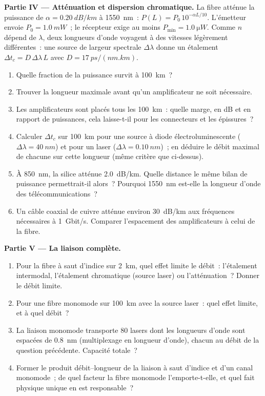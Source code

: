 \begin{problem}
\medskip
\noindent\textbf{Partie IV --- Atténuation et dispersion chromatique.}
La fibre atténue la puissance de $\alpha = \qty{0.20}{dB/km}$ à
\qty{1550}{nm}~: $P(L) = P_0\,10^{-\alpha L/10}$. L'émetteur envoie
$P_0 = \qty{1.0}{mW}$~; le récepteur exige au moins
$P_{\min} = \qty{1.0}{\micro W}$. Comme $n$ dépend de $\lambda$, deux
longueurs d'onde voyagent à des vitesses légèrement différentes~: une
source de largeur spectrale $\Delta\lambda$ donne un étalement
$\Delta t_c = D\,\Delta\lambda\,L$ avec $D = \qty{17}{ps/(nm.km)}$.
\begin{enumerate}[resume]
  \item Quelle fraction de la puissance survit à \qty{100}{km}~?
  \item Trouver la longueur maximale avant qu'un amplificateur ne soit
        nécessaire.
  \item Les amplificateurs sont placés tous les \qty{100}{km}~: quelle
        marge, en dB et en rapport de puissances, cela laisse-t-il pour
        les connecteurs et les épissures~?
  \item Calculer $\Delta t_c$ sur \qty{100}{km} pour une source à
        diode électroluminescente ($\Delta\lambda = \qty{40}{nm}$) et
        pour un laser ($\Delta\lambda = \qty{0.10}{nm}$)~; en déduire le
        débit maximal de chacune sur cette longueur (même critère que
        ci-dessus).
  \item À \qty{850}{nm}, la silice atténue \qty{2.0}{dB/km}. Quelle
        distance le même bilan de puissance permettrait-il alors~?
        Pourquoi \qty{1550}{nm} est-elle la longueur d'onde des
        télécommunications~?
  \item Un câble coaxial de cuivre atténue environ \qty{30}{dB/km} aux
        fréquences nécessaires à \qty{1}{Gbit/s}. Comparer l'espacement
        des amplificateurs à celui de la fibre.
\end{enumerate}

\medskip
\noindent\textbf{Partie V --- La liaison complète.}
\begin{enumerate}[resume]
  \item Pour la fibre à saut d'indice sur \qty{2}{km}, quel effet limite
        le débit~: l'étalement intermodal, l'étalement chromatique
        (source laser) ou l'atténuation~? Donner le débit limite.
  \item Pour une fibre monomode sur \qty{100}{km} avec la source laser~:
        quel effet limite, et à quel débit~?
  \item La liaison monomode transporte $80$ lasers dont les longueurs
        d'onde sont espacées de \qty{0.8}{nm} (multiplexage en longueur
        d'onde), chacun au débit de la question précédente. Capacité
        totale~?
  \item Former le produit débit--longueur de la liaison à saut d'indice
        et d'un canal monomode~; de quel facteur la fibre monomode
        l'emporte-t-elle, et quel fait physique unique en est
        responsable~?
\end{enumerate}
\end{problem}

